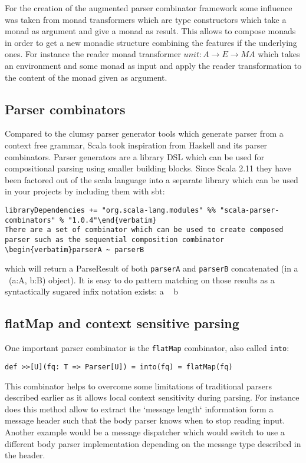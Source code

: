 For the creation of the augmented parser combinator framework some influence was taken from monad transformers which are type constructors which take a monad as argument and give a monad as result. This allows to compose monads in order to get a new monadic structure combining the features if the underlying ones. For instance the reader monad transformer
$unit: A \rightarrow E \rightarrow M A $ which takes an environment and some monad as input and apply the reader transformation to the content of the monad given as argument. 

\subsection{Parser combinators}
Compared to the clumsy parser generator tools which generate parser from a context free grammar, Scala took inspiration from Haskell and its parser combinators. Parser generators are a library DSL which can be used for compositional parsing using smaller building blocks.
Since Scala 2.11 they have been factored out of the scala language into a separate library which can be used in your projects by including them with sbt:
\begin{verbatim}libraryDependencies += "org.scala-lang.modules" %% "scala-parser-combinators" % "1.0.4"\end{verbatim}
There are a set of combinator which can be used to create composed parser such as the sequential composition combinator \begin{verbatim}parserA ~ parserB\end{verbatim} which will return a ParseResult of both \verb/parserA/ and \verb/parserB/ concatenated (in a ~(a:A, b:B) object). It is easy to do pattern matching on those results as a syntactically sugared infix notation exists: a ~ b

\subsection{flatMap and context sensitive parsing}
One important parser combinator is the \verb/flatMap/ combinator, also called \verb/into/:
\begin{verbatim}def >>[U](fq: T => Parser[U]) = into(fq) = flatMap(fq)\end{verbatim}
This combinator helps to overcome some limitations of traditional parsers described earlier as it allows local context sensitivity during parsing. For instance does this method allow to extract the `message length` information form a message header such that the body parser knows when to stop reading input. Another example would be a message dispatcher which would switch to use a different body parser implementation depending on the message type described in the header.
